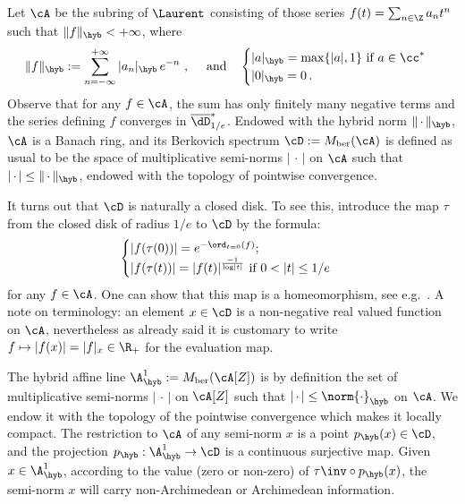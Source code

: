 Let $\cA$ be the subring of $\Laurent$ consisting of those series $f(t) = \sum_{n \in \Z} a_n t^n$ such that $\|f\|_{\hyb} < + \infty$, where
\[
\|f\|_{\hyb}:= \sum_{n= - \infty}^{+\infty} |a_n|_{\hyb}\, e^{-n}~, \quad\text{ and}\quad
\begin{cases}
|a|_{\hyb} = \max\{ |a|, 1\} \text{ if }a\in \cc^* \\ |0|_{\hyb} =0\,.
\end{cases}
\]
Observe that for any $f\in \cA$, the sum has only finitely many negative terms and the series defining $f$ converges in $\overline{\dD}^*_{1/e}$. Endowed with the hybrid norm $\|{\,\cdot\,}\|_{\hyb}$, $\cA$ is a Banach ring, and its Berkovich spectrum $\cD:= M_{\mathrm{ber}}(\cA)$ is defined as usual to be the space of multiplicative semi-norms $|{\,\cdot\,}|$ on $\cA$ such that $|{\,\cdot\,}| \le \|{\,\cdot\,}\|_{\hyb}$, endowed with the topology of pointwise convergence.

It turns out that $\cD$ is naturally a closed disk. To see this, introduce the map $\tau$ from the closed disk of radius $1/e$ to $\cD$ by the formula:
\begin{equation}\label{eqn:def hyb}
\begin{cases}
|f(\tau(0))| = e^{-\ord_{t=0}(f)};
\\
|f(\tau(t))| = |f(t)|^{\frac{-1}{\log\mathopen|t\mathclose|}} \text{ if } 0 < |t| \le 1/e
\end{cases}
\end{equation}
for any $f\in \cA$. One can show that this map is a homeomorphism, see e.g.~\cite[Prop.~1.1]{degeneration}. A note on terminology: an element $x \in \cD$ is a non-negative real valued function on $\cA$, nevertheless as already said it is customary to write $f \mapsto |f(x)| = |f|_x \in \R_+$ for the evaluation map.

The hybrid affine line $\A^1_{\hyb}:= M_{\mathrm{ber}}(\cA[Z])$ is by definition the set of multiplicative semi-norms $|{\,\cdot\,}|$ on $\cA[Z]$ such that $|{\,\cdot\,}| \le \norm{\cdot}_{\hyb}$ on $\cA$. We endow it with the topology of the pointwise convergence which makes it locally compact. The restriction to $\cA$ of any semi-norm $x$ is a point $p_{\hyb}(x) \in \cD$, and the projection $p_{\hyb} : \A^1_{\hyb}\to \cD$ is a continuous surjective map. Given $x\in \A^1_{\hyb}$, according to the value (zero or non-zero) of $ \tau\inv \circ p_{\hyb}(x)$, the semi-norm $x$ will carry non-Archimedean or Archimedean information.

